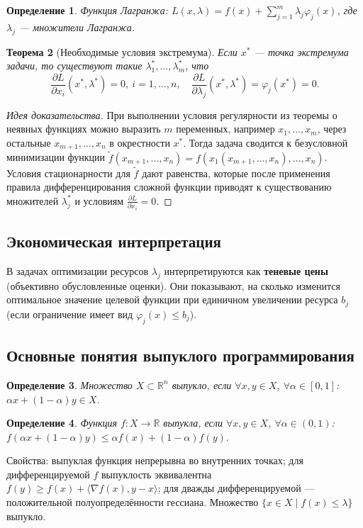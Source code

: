 \documentclass{article}
\theoremstyle{plain}
\newtheorem{theorem}{Теорема}[section]
\newtheorem{definition}[theorem]{Определение}
\begin{document}
\begin{definition}
Функция Лагранжа: $L(x, \lambda) = f(x) + \sum_{j=1}^m \lambda_j \varphi_j(x)$, где $\lambda_j$ — множители Лагранжа.
\end{definition}

\begin{theorem}[Необходимые условия экстремума]
Если $x^*$ — точка экстремума задачи, то существуют такие $\lambda_1^*,\dots,\lambda_m^*$, что
\[
\frac{\partial L}{\partial x_i}(x^*,\lambda^*) = 0,\ i=1,\dots,n,\quad \frac{\partial L}{\partial \lambda_j}(x^*,\lambda^*) = \varphi_j(x^*) = 0.
\]
\end{theorem}
\begin{proof}[Идея доказательства]
При выполнении условия регулярности из теоремы о неявных функциях можно выразить $m$ переменных, например $x_1,\dots,x_m$, через остальные $x_{m+1},\dots,x_n$ в окрестности $x^*$. Тогда задача сводится к безусловной минимизации функции $\tilde{f}(x_{m+1},\dots,x_n) = f(x_1(x_{m+1},\dots,x_n),\dots,x_n)$. Условия стационарности для $\tilde{f}$ дают равенства, которые после применения правила дифференцирования сложной функции приводят к существованию множителей $\lambda_j^*$ и условиям $\frac{\partial L}{\partial x_i}=0$.
\end{proof}

\subsection{Экономическая интерпретация}
В задачах оптимизации ресурсов $\lambda_j$ интерпретируются как \textbf{теневые цены} (объективно обусловленные оценки). Они показывают, на сколько изменится оптимальное значение целевой функции при единичном увеличении ресурса $b_j$ (если ограничение имеет вид $\varphi_j(x) \le b_j$).

\subsection{Основные понятия выпуклого программирования}
\begin{definition}
Множество $X \subset \mathbb{R}^n$ выпукло, если $\forall x,y \in X$, $\forall \alpha \in [0,1]$: $\alpha x + (1-\alpha)y \in X$.
\end{definition}
\begin{definition}
Функция $f: X \to \mathbb{R}$ выпукла, если $\forall x,y \in X$, $\forall \alpha \in (0,1)$: $f(\alpha x + (1-\alpha)y) \le \alpha f(x) + (1-\alpha) f(y)$.
\end{definition}
Свойства: выпуклая функция непрерывна во внутренних точках; для дифференцируемой $f$ выпуклость эквивалентна $f(y) \ge f(x) + \langle \nabla f(x), y-x \rangle$; для дважды дифференцируемой — положительной полуопределённости гессиана. Множество $\{x \in X \mid f(x) \le \lambda\}$ выпукло.
\end{document}
